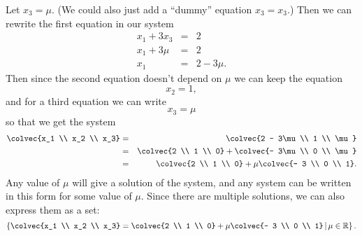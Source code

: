 {Let $x_3 = \mu$. (We could also just add a ``dummy'' equation $x_3=x_3$.) Then we can rewrite the first equation in our system
\begin{eqnarray*}
 x_1+ 3x_3 &=& 2\\
x_1+ 3\mu &=& 2\\
x_1 &=& 2 -3\mu.
\end{eqnarray*}
Then since the second equation doesn't depend on $\mu$ we can keep the equation 
$$  x_2 = 1, $$
and for a third equation we can write
$$x_3 = \mu $$
so that we get the system
\begin{eqnarray*}
  \colvec{x_1 \\ x_2 \\ x_3} &=& \colvec{2 - 3\mu \\ 1 \\ \mu}\\
	&=&  \colvec{2 \\ 1 \\ 0} +  \colvec{- 3\mu \\ 0 \\ \mu} \\
	&=& \colvec{2 \\ 1 \\ 0} +  \mu \colvec{- 3 \\ 0 \\ 1}.
\end{eqnarray*}
Any value of $\mu$ will give a solution of the system, and any system can be written in this form for some value of $\mu$. Since there are multiple solutions, we can also express them as a set:
\[
\left\{ \colvec{x_1 \\ x_2 \\ x_3} = \colvec{2 \\ 1 \\ 0} + \mu \colvec{- 3 \\ 0 \\ 1}
\; \vline \; \mu \in \mathbb{R} \right\}.
\]

}

